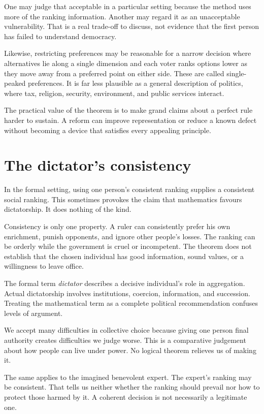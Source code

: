 \documentclass[12pt,a4paper]{book}
\begin{document}
One may judge that acceptable in a particular setting because the method uses more of the ranking information. Another may regard it as an unacceptable vulnerability. That is a real trade-off to discuss, not evidence that the first person has failed to understand democracy.

Likewise, restricting preferences may be reasonable for a narrow decision where alternatives lie along a single dimension and each voter ranks options lower as they move away from a preferred point on either side. These are called single-peaked preferences. It is far less plausible as a general description of politics, where tax, religion, security, environment, and public services interact.

The practical value of the theorem is to make grand claims about a perfect rule harder to sustain. A reform can improve representation or reduce a known defect without becoming a device that satisfies every appealing principle.

\section*{The dictator's consistency}

In the formal setting, using one person's consistent ranking supplies a consistent social ranking. This sometimes provokes the claim that mathematics favours dictatorship. It does nothing of the kind.

Consistency is only one property. A ruler can consistently prefer his own enrichment, punish opponents, and ignore other people's losses. The ranking can be orderly while the government is cruel or incompetent. The theorem does not establish that the chosen individual has good information, sound values, or a willingness to leave office.

The formal term \emph{dictator} describes a decisive individual's role in aggregation. Actual dictatorship involves institutions, coercion, information, and succession. Treating the mathematical term as a complete political recommendation confuses levels of argument.

We accept many difficulties in collective choice because giving one person final authority creates difficulties we judge worse. This is a comparative judgement about how people can live under power. No logical theorem relieves us of making it.

The same applies to the imagined benevolent expert. The expert's ranking may be consistent. That tells us neither whether the ranking should prevail nor how to protect those harmed by it. A coherent decision is not necessarily a legitimate one.
\end{document}
